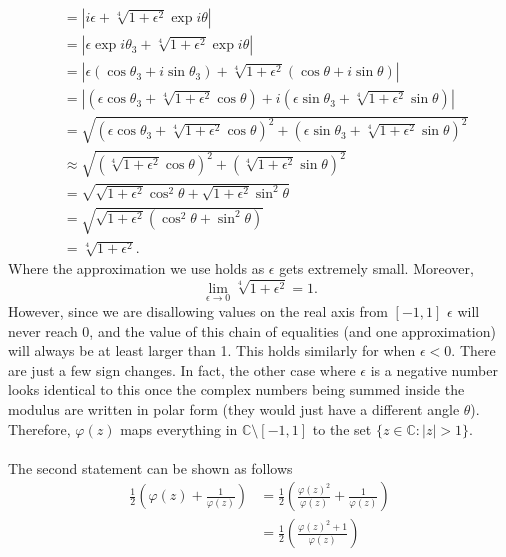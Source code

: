\documentclass[10pt]{amsart}
\theoremstyle{nonumberplain}
\begin{document}
\begin{enumerate}[label={\bf {\arabic*}:}]
\begin{align*}
										  &= \left| i\epsilon + \sqrt[4]{1 + \epsilon^2}\exp{i\theta}\right| \\
										  &= \left| \epsilon\exp i\theta_3 + \sqrt[4]{1 + \epsilon^2}\exp{i\theta}\right| \\
										  &= \left| \epsilon\left(\cos\theta_3 + i\sin\theta_3\right) + \sqrt[4]{1 + \epsilon^2}\left(\cos\theta + i\sin\theta\right)\right| \\
										  &= \left| \left(\epsilon\cos\theta_3 + \sqrt[4]{1 + \epsilon^2}\cos\theta\right) + i\left(\epsilon\sin\theta_3 + \sqrt[4]{1 + \epsilon^2}\sin\theta\right) \right| \\
										  &= \sqrt{\left(\epsilon\cos\theta_3 + \sqrt[4]{1 + \epsilon^2}\cos\theta\right)^2 + \left(\epsilon\sin\theta_3 + \sqrt[4]{1 + \epsilon^2}\sin\theta\right)^2 } \\
										  &\approx \sqrt{\left(\sqrt[4]{1 + \epsilon^2}\cos\theta\right)^2 + \left(\sqrt[4]{1 + \epsilon^2}\sin\theta\right)^2 } \\
										  &= \sqrt{\sqrt{1 + \epsilon^2}\cos^2\theta + \sqrt{1 + \epsilon^2}\sin^2\theta } \\
										  &= \sqrt{\sqrt{1 + \epsilon^2}\left(\cos^2\theta + \sin^2\theta\right) } \\
										  &= \sqrt[4]{1 + \epsilon^2}.
\end{align*}
Where the approximation we use holds as $\epsilon$ gets extremely small.
Moreover, 
$$
\lim_{\epsilon\rightarrow 0} \sqrt[4]{1 + \epsilon^2} = 1.
$$
However, since we are disallowing values on the real axis from $[-1, 1]$ $\epsilon$ will never reach 0, and the value of this chain of equalities (and one approximation) will always be at least larger than 1.
This holds similarly for when $\epsilon < 0$.
There are just a few sign changes.
In fact, the other case where $\epsilon$ is a negative number looks identical to this once the complex numbers being summed inside the modulus are written in polar form (they would just have a different angle $\theta$).
Therefore, $\varphi(z)$ maps everything in $\mathbb C \setminus [-1, 1]$ to the set $\{z \in \mathbb C : |z| > 1\}$.
\\
\\
The second statement can be shown as follows \\
\begin{align*}
\frac{1}{2}\left(\varphi(z) + \frac{1}{\varphi(z)}\right) &= \frac{1}{2}\left(\frac{\varphi(z)^2}{\varphi(z)} + \frac{1}{\varphi(z)}\right) \\
   &= \frac{1}{2}\left(\frac{\varphi(z)^2 + 1}{\varphi(z)}\right) \\

\end{align*}
\end{enumerate}
\end{document}
